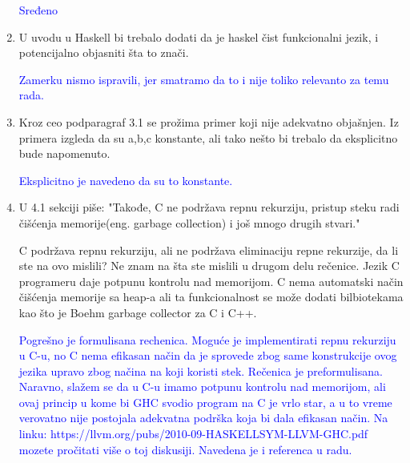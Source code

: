 \documentclass[a4paper]{report}
\newcommand{\odgovor}[1]{\textcolor{blue}{#1}}
\begin{document}
\begin{enumerate}
		\odgovor{Sređeno}
		
		\item U uvodu u Haskell bi trebalo dodati da je haskel čist funkcionalni jezik, i potencijalno objasniti šta to znači.
		
		\odgovor{Zamerku nismo ispravili, jer smatramo da to i nije toliko relevanto za temu rada.}
		
		\item Kroz ceo podparagraf 3.1 se prožima primer koji nije adekvatno objašnjen. Iz primera izgleda da su a,b,c konstante, ali tako nešto bi trebalo da eksplicitno bude napomenuto.
		
		\odgovor{Eksplicitno je navedeno da su to konstante.}
		
		\item U 4.1 sekciji piše:
		"Takođe, C ne podržava repnu rekurziju, pristup steku radi čišćenja memorije(eng. garbage collection) i još mnogo drugih stvari."
		
		C podržava repnu rekurziju, ali ne podržava eliminaciju repne rekurzije, da li ste na ovo mislili? Ne znam na šta ste mislili u drugom delu rečenice. Jezik C programeru daje potpunu kontrolu nad memorijom. C nema automatski način čišćenja memorije sa heap-a ali ta funkcionalnost se može dodati bilbiotekama kao što je Boehm garbage collector za C i C++.
		
		\odgovor{Pogrešno je formulisana rechenica. Moguće je implementirati repnu rekurziju u C-u, no C nema efikasan način da je sprovede zbog same konstrukcije ovog jezika upravo zbog načina na koji koristi stek. Rečenica je preformulisana. Naravno, slažem se da u C-u imamo potpunu kontrolu nad memorijom, ali ovaj princip u kome bi GHC svodio program na C je vrlo star, a u to vreme verovatno nije postojala adekvatna podrška koja bi dala efikasan način. Na linku: https://llvm.org/pubs/2010-09-HASKELLSYM-LLVM-GHC.pdf mozete pročitati više o toj diskusiji. Navedena je i referenca u radu.}
		
		
		
	\end{enumerate}
	
\end{document}
